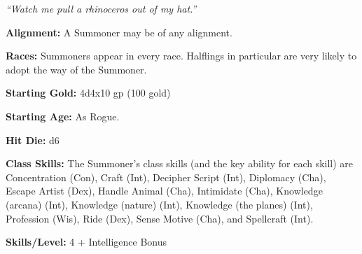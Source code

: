 \documentclass[10pt]{article}
\newcommand{\ability}[2]{\smallskip \noindent \textbf{#1} #2}
\newcommand{\classname}[1]{\noindent{\huge \textbf{#1}}}
\newcommand{\quot}[1]{\emph{#1}\medskip}
\begin{document}
\newpage

\classname{Summoner}

\quot{``Watch me pull a rhinoceros out of my hat.''}

\ability{Alignment:}{A Summoner may be of any alignment.}

\ability{Races:}{Summoners appear in every race. Halflings in particular are very likely to adopt the way of the Summoner.}

\ability{Starting Gold:}{4d4x10 gp (100 gold)}

\ability{Starting Age:}{As Rogue.}

\ability{Hit Die:}{d6}

\ability{Class Skills:}{The Summoner's class skills (and the key ability for each skill) are Concentration (Con), Craft (Int), Decipher Script (Int), Diplomacy (Cha), Escape Artist (Dex), Handle Animal (Cha), Intimidate (Cha), Knowledge (arcana) (Int), Knowledge (nature) (Int), Knowledge (the planes) (Int), Profession (Wis), Ride (Dex), Sense Motive (Cha), and Spellcraft (Int).}

\ability{Skills/Level:}{4 + Intelligence Bonus}
\end{document}
